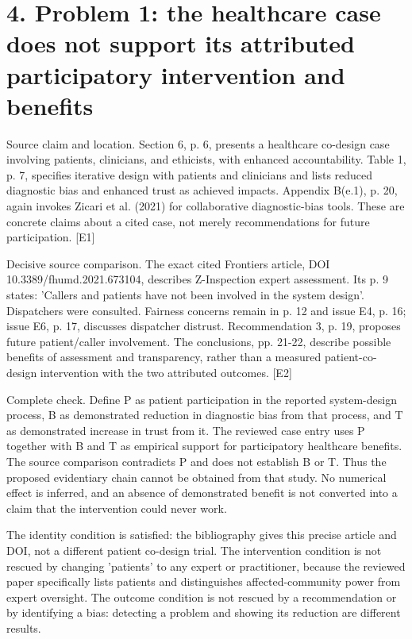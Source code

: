 \documentclass[10pt]{article}
\begin{document}
\section*{4. Problem 1: the healthcare case does not support its attributed participatory intervention and benefits}
Source claim and location. Section 6, p. 6, presents a healthcare co-design case involving patients, clinicians, and ethicists, with enhanced accountability. Table 1, p. 7, specifies iterative design with patients and clinicians and lists reduced diagnostic bias and enhanced trust as achieved impacts. Appendix B(e.1), p. 20, again invokes Zicari et al. (2021) for collaborative diagnostic-bias tools. These are concrete claims about a cited case, not merely recommendations for future participation. [E1]\par
Decisive source comparison. The exact cited Frontiers article, DOI 10.3389/fhumd.2021.673104, describes Z-Inspection expert assessment. Its p. 9 states: ’Callers and patients have not been involved in the system design’. Dispatchers were consulted. Fairness concerns remain in p. 12 and issue E4, p. 16; issue E6, p. 17, discusses dispatcher distrust. Recommendation 3, p. 19, proposes future patient/caller involvement. The conclusions, pp. 21-22, describe possible benefits of assessment and transparency, rather than a measured patient-co-design intervention with the two attributed outcomes. [E2]\par
Complete check. Define P as patient participation in the reported system-design process, B as demonstrated reduction in diagnostic bias from that process, and T as demonstrated increase in trust from it. The reviewed case entry uses P together with B and T as empirical support for participatory healthcare benefits. The source comparison contradicts P and does not establish B or T. Thus the proposed evidentiary chain cannot be obtained from that study. No numerical effect is inferred, and an absence of demonstrated benefit is not converted into a claim that the intervention could never work.\par
The identity condition is satisfied: the bibliography gives this precise article and DOI, not a different patient co-design trial. The intervention condition is not rescued by changing ’patients’ to any expert or practitioner, because the reviewed paper specifically lists patients and distinguishes affected-community power from expert oversight. The outcome condition is not rescued by a recommendation or by identifying a bias: detecting a problem and showing its reduction are different results.\par
\end{document}
